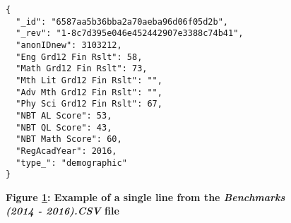 \begin{figure}[H]
  \centering
  \begin{mdframed}
    \centering
    \begin{verbatim}
{
  "_id": "6587aa5b36bba2a70aeba96d06f05d2b",
  "_rev": "1-8c7d395e046e452442907e3388c74b41",
  "anonIDnew": 3103212,
  "Eng Grd12 Fin Rslt": 58,
  "Math Grd12 Fin Rslt": 73,
  "Mth Lit Grd12 Fin Rslt": "",
  "Adv Mth Grd12 Fin Rslt": "",
  "Phy Sci Grd12 Fin Rslt": 67,
  "NBT AL Score": 53,
  "NBT QL Score": 43,
  "NBT Math Score": 60,
  "RegAcadYear": 2016,
  "type_": "demographic"
}         
        \end{verbatim}
  \end{mdframed}
  \caption[Event Document JSON Sample]{\textbf{Figure \ref{fig-benchmarks-json-sample}: Example of a single line from the \textit{Benchmarks (2014 - 2016).CSV} file}}
  \label{fig-benchmarks-json-sample}
\end{figure}